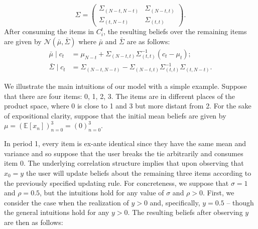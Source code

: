 \documentclass[manuscript, nonacm]{acmart}
\newcommand{\xhdr}[1]{\vspace{1mm} \noindent{\bf #1}}
\begin{document}
\[ \Sigma =  \left( \begin{array}{cc}
\Sigma_{(N-t, N-t)} & \Sigma_{(N-t,t)} \\
\Sigma_{(t,N-t)} & \Sigma_{(t,t)}
\end{array} \right).
\]
After consuming the items in $C_{i}^{t}$, the resulting beliefs over the remaining items are given by $\mathcal{N}(\bar{\mu}, \bar{\Sigma})$ where $\bar{\mu}$ and $\bar{\Sigma}$ are as follows:
\begin{align*}
\bar{\mu} \mid c_t &= \mu_{N-t} + \Sigma_{(N-t,t)} \Sigma_{(t,t)}^{-1}(c_t - \mu_t); \\
\bar{\Sigma} \mid c_t &= \Sigma_{(N-t,N-t)} - \Sigma_{(N-t,t)} \Sigma_{(t,t)}^{-1} \Sigma_{(t,N-t)}.
\end{align*}

\xhdr{An Illustrative Example.} We illustrate the main intuitions of our model with a simple example. Suppose that there are four items: 0, 1, 2, 3. The items are in different places of the product space, where 0 is close to 1 and 3 but more distant from 2. For the sake of expositional clarity, suppose that the initial mean beliefs are given by $\mu=(\mathbb E[x_n])_{n=0}^3=(0)_{n=0}^3$.
\par
In period 1, every item is ex-ante identical since they have the same mean and variance and so suppose that the user breaks the tie arbitrarily and consumes item 0. The underlying correlation structure implies that upon observing that $x_0 = y$ the user will update beliefs about the remaining three items according to the previously specified updating rule. For concreteness, we suppose that $\sigma = 1$ and $\rho = 0.5$, but the intuitions hold for any value of $\sigma$ and $\rho > 0$. First, we consider the case when the realization of $y > 0$ and, specifically, $y = 0.5$ -- though the general intuitions hold for any $y > 0$. The resulting beliefs after observing $y$ are then as follows:
\end{document}
